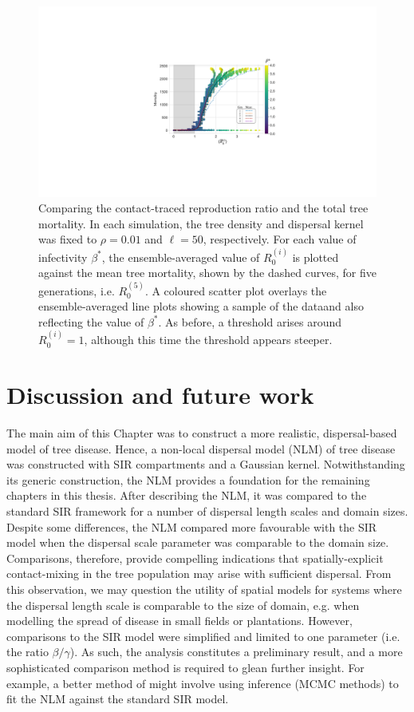 \begin{figure}
    \centering
    \includegraphics[scale=0.6]{chapter5/figures/fig6-R0-contact-vs-mortality.pdf}
    \caption{Comparing the contact-traced reproduction ratio and the total tree mortality. 
    In each simulation, the tree density and dispersal kernel was fixed to $\rho=0.01$ and $\ell=50$, respectively. 
    For each value of infectivity $\beta^*$, the ensemble-averaged value of $R_0^{(i)}$ is plotted against the mean tree mortality, shown by the dashed curves, for five generations, i.e. $R_{0}^{(5)}$.
    A coloured scatter plot overlays the ensemble-averaged line plots showing a sample of the data\textemdash and also reflecting the value of $\beta^*$.
    As before, a threshold arises around $R_0^{(i)} = 1$, although this time the threshold appears steeper.}
    \label{fig:contact-trace-vs-mortality}
\end{figure}

\newpage
\section{Discussion and future work}

The main aim of this Chapter was to construct a more realistic, dispersal-based model of tree disease.
Hence, a non-local dispersal model (NLM) of tree disease was constructed with SIR compartments and a Gaussian kernel.
Notwithstanding its generic construction, the NLM provides a foundation for the remaining chapters in this thesis.
After describing the NLM, it was compared to the standard SIR framework for a number of dispersal length scales and domain sizes.
Despite some differences, the NLM compared more favourable with the SIR model when the dispersal scale parameter was comparable to the domain size.
Comparisons, therefore, provide compelling indications that spatially-explicit contact-mixing in the tree population may arise with sufficient dispersal.
From this observation, we may question the utility of spatial models for systems where the dispersal length scale is comparable to the size of domain, e.g. when modelling the spread of disease in small fields or plantations. However, comparisons to the SIR model were simplified and limited to one parameter (i.e. the ratio $\beta/\gamma$). As such, the analysis constitutes a preliminary result, and a more sophisticated comparison method is required to glean further insight. For example, a better method of might involve using inference (MCMC methods) to fit the NLM against the standard SIR model.

